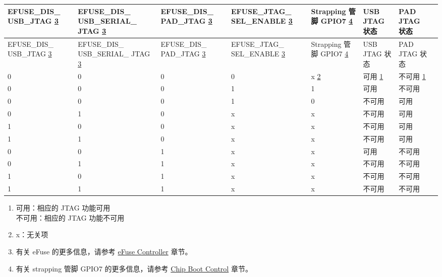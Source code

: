 
\begin{longtable}{ | p{1.8cm} | p{1.9cm} | p{2.1cm} | p{1.9cm} | p{2.1cm} | p{1.4cm} | p{1.7cm} | p{2.0cm} | }
\hline\rowcolor{lightgray}
EFUSE\_DIS\_ USB\_JTAG \hyperref[JTAG footnote: 3]{3} & EFUSE\_DIS\_ USB\_SERIAL\_ JTAG \hyperref[JTAG footnote: 3]{3} & EFUSE\_DIS\_ PAD\_JTAG \hyperref[JTAG footnote: 3]{3} & EFUSE\_JTAG\_ SEL\_ENABLE \hyperref[JTAG footnote: 3]{3} & Strapping 管脚 GPIO7 \hyperref[JTAG footnote: 4]{4} & USB JTAG 状态 & PAD JTAG 状态 \\ \hline
\endfirsthead
\hline
\rowcolor{lightgray}
EFUSE\_DIS\_ USB\_JTAG \hyperref[JTAG footnote: 3]{3} & EFUSE\_DIS\_ USB\_SERIAL\_ JTAG \hyperref[JTAG footnote: 3]{3} & EFUSE\_DIS\_ PAD\_JTAG \hyperref[JTAG footnote: 3]{3} & EFUSE\_JTAG\_ SEL\_ENABLE \hyperref[JTAG footnote: 3]{3} & Strapping 管脚 GPIO7  \hyperref[JTAG footnote: 4]{4} & USB JTAG 状态 & PAD JTAG 状态 \\ \hline
\hline
\endhead
\endfoot

0 & 0 & 0 & 0 & x \hyperref[JTAG footnote: 2]{2}	& 可用	 \hyperref[JTAG footnote: 1]{1}  &     不可用  \hyperref[JTAG footnote: 1]{1}  \\\hline
0 & 0 & 0 & 1 & 1	& 可用	 &  不可用   \\\hline
0 & 0 & 0 & 1 & 0	& 不可用 & 	可用 \\\hline
0 & 1 & 0 & x & x	& 不可用 & 	可用 \\\hline
1 & 0 & 0 & x & x	& 不可用 & 	可用 \\\hline
1 & 1 & 0 & x & x	& 不可用 & 	可用 \\\hline
0 & 0 & 1 & x & x	& 可用	 &  不可用 \\\hline
0 & 1 & 1 & x & x	& 不可用 & 	不可用 \\\hline
1 & 0 & 1 & x & x	& 不可用 & 	不可用 \\\hline
1 & 1 & 1 & x & x	& 不可用 & 	不可用 \\\hline

\end{longtable}


\begin{tiplisting}
\vspace{-2em}
\begin{enumerate}
\item \label{JTAG footnote: 1}
    可用：相应的 JTAG 功能可用\\
    不可用：相应的 JTAG 功能不可用
\item \label{JTAG footnote: 2}
    x：无关项
\item \label{JTAG footnote: 3}
    有关 eFuse 的更多信息，请参考 \hyperref[mod:efuse]{eFuse Controller} 章节。
\item \label{JTAG footnote: 4}
    有关 strapping 管脚 GPIO7 的更多信息，请参考 \hyperref[mod:bootctrl]{Chip Boot Control} 章节。
\end{enumerate}
\end{tiplisting}